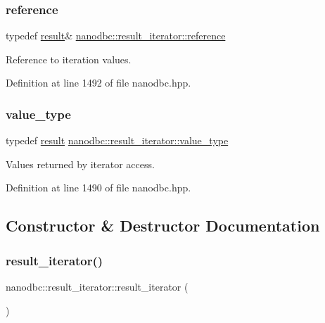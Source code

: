 \subsubsection{\texorpdfstring{reference}{reference}}
{\footnotesize\ttfamily typedef \mbox{\hyperlink{classnanodbc_1_1result}{result}}\& \mbox{\hyperlink{classnanodbc_1_1result__iterator_aeca21fe535e223231562d96a76c5ee92}{nanodbc\+::result\+\_\+iterator\+::reference}}}



Reference to iteration values. 



Definition at line 1492 of file nanodbc.\+hpp.

\mbox{\label{classnanodbc_1_1result__iterator_a70c5112a23653e61cfd840631f5a370e}} 
\subsubsection{\texorpdfstring{value\_type}{value\_type}}
{\footnotesize\ttfamily typedef \mbox{\hyperlink{classnanodbc_1_1result}{result}} \mbox{\hyperlink{classnanodbc_1_1result__iterator_a70c5112a23653e61cfd840631f5a370e}{nanodbc\+::result\+\_\+iterator\+::value\+\_\+type}}}



Values returned by iterator access. 



Definition at line 1490 of file nanodbc.\+hpp.



\subsection{Constructor \& Destructor Documentation}
\mbox{\label{classnanodbc_1_1result__iterator_a3802a8a11ad2f043484be879e92fbd33}} 
\subsubsection{\texorpdfstring{result\_iterator()}{result\_iterator()}\hspace{0.1cm}{\footnotesize\ttfamily [1/2]}}
{\footnotesize\ttfamily nanodbc\+::result\+\_\+iterator\+::result\+\_\+iterator (\begin{DoxyParamCaption}{ }\end{DoxyParamCaption})\hspace{0.3cm}{\ttfamily [default]}}



